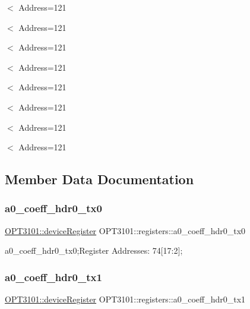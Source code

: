 $<$ Address=121

$<$ Address=121

$<$ Address=121

$<$ Address=121

$<$ Address=121

$<$ Address=121

$<$ Address=121

$<$ Address=121 

\subsection{Member Data Documentation}
\mbox{\label{class_o_p_t3101_1_1registers_ac9bd91107a6b02c8a5eef960a5d72e2c}} 
\subsubsection{\texorpdfstring{a0\+\_\+coeff\+\_\+hdr0\+\_\+tx0}{a0\_coeff\_hdr0\_tx0}}
{\footnotesize\ttfamily \mbox{\hyperlink{class_o_p_t3101_1_1device_register}{O\+P\+T3101\+::device\+Register}} O\+P\+T3101\+::registers\+::a0\+\_\+coeff\+\_\+hdr0\+\_\+tx0}



a0\+\_\+coeff\+\_\+hdr0\+\_\+tx0;Register Addresses\+: 74\mbox{[}17\+:2\mbox{]}; 

\mbox{\label{class_o_p_t3101_1_1registers_a733f21a2ae70f6d7f9d75c0c8c32c46d}} 
\subsubsection{\texorpdfstring{a0\+\_\+coeff\+\_\+hdr0\+\_\+tx1}{a0\_coeff\_hdr0\_tx1}}
{\footnotesize\ttfamily \mbox{\hyperlink{class_o_p_t3101_1_1device_register}{O\+P\+T3101\+::device\+Register}} O\+P\+T3101\+::registers\+::a0\+\_\+coeff\+\_\+hdr0\+\_\+tx1}



